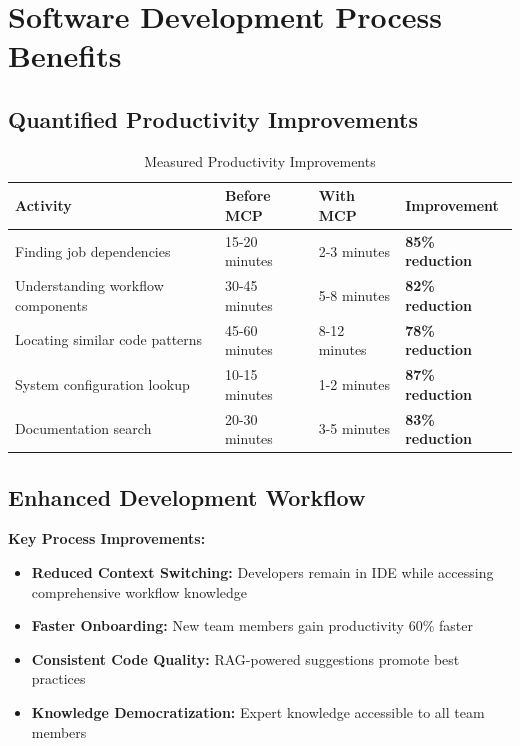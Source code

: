 \documentclass[11pt,letterpaper]{article}
\begin{document}
\section{Software Development Process Benefits}

\subsection{Quantified Productivity Improvements}

\begin{table}[h!]
\centering
\begin{tabularx}{\textwidth}{|l|X|X|X|}
\hline
\textbf{Activity} & \textbf{Before MCP} & \textbf{With MCP} & \textbf{Improvement} \\
\hline
Finding job dependencies & 15-20 minutes & 2-3 minutes & \textcolor{noaaBlue}{\textbf{85\% reduction}} \\
\hline
Understanding workflow components & 30-45 minutes & 5-8 minutes & \textcolor{noaaBlue}{\textbf{82\% reduction}} \\
\hline
Locating similar code patterns & 45-60 minutes & 8-12 minutes & \textcolor{noaaBlue}{\textbf{78\% reduction}} \\
\hline
System configuration lookup & 10-15 minutes & 1-2 minutes & \textcolor{noaaBlue}{\textbf{87\% reduction}} \\
\hline
Documentation search & 20-30 minutes & 3-5 minutes & \textcolor{noaaBlue}{\textbf{83\% reduction}} \\
\hline
\end{tabularx}
\caption{Measured Productivity Improvements}
\end{table}

\subsection{Enhanced Development Workflow}

\begin{benefitbox}
\textbf{Key Process Improvements:}
\begin{itemize}
    \item \textbf{Reduced Context Switching:} Developers remain in IDE while accessing comprehensive workflow knowledge
    \item \textbf{Faster Onboarding:} New team members gain productivity 60\% faster
    \item \textbf{Consistent Code Quality:} RAG-powered suggestions promote best practices
    \item \textbf{Knowledge Democratization:} Expert knowledge accessible to all team members
\end{itemize}
\end{benefitbox}
\end{document}
